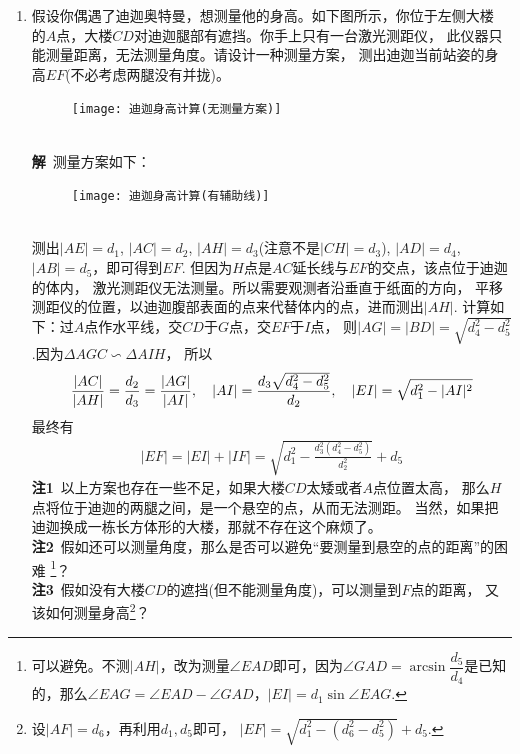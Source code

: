 \begin{enumerate}[label={【\textbf{例\thechapter.\arabic*}】},
 leftmargin=\inteval{\myenumleftmargin}pt,
 itemsep=\inteval{\myenumitempsep}pt,
 itemindent=\inteval{\myenumitemindent}pt]
\item 假设你偶遇了迪迦奥特曼，想测量他的身高。如下图所示，你位于左侧大楼
的$ A $点，大楼$ CD $对迪迦腿部有遮挡。你手上只有一台激光测距仪，
此仪器只能测量距离，无法测量角度。请设计一种测量方案，
测出迪迦当前站姿的身高$ EF $(不必考虑两腿没有并拢)。
\begin{figure}[h]
    \centering
    \texttt{[image: 迪迦身高计算(无测量方案)]}
\end{figure} \\
\textbf{解}\ 测量方案如下：
\begin{figure}[h]
    \centering
    \texttt{[image: 迪迦身高计算(有辅助线)]}
\end{figure} \\
测出$ |AE|=d_1 $, $ |AC|=d_2 $, $ |AH|=d_3 $(注意不是$ |CH|=d_3 $),
$ |AD|=d_4 $, $ |AB|=d_5 $，即可得到$ EF $.
但因为$ H $点是$ AC $延长线与$ EF $的交点，该点位于迪迦的体内，
激光测距仪无法测量。所以需要观测者沿垂直于纸面的方向，
平移测距仪的位置，以迪迦腹部表面的点来代替体内的点，进而测出$ |AH| $.
计算如下：过$ A $点作水平线，交$ CD $于$ G $点，交$ EF $于$ I $点，
则$ |AG|=|BD|=\sqrt{d_4^2-d_5^2} $.因为$ \Delta AGC \backsim \Delta AIH $，
所以
\begin{gather*}
    \dfrac{|AC|}{|AH|}=\dfrac{d_2}{d_3}=\dfrac{|AG|}{|AI|},\quad  |AI|=\dfrac{d_3\sqrt{d_4^2-d_5^2} }{d_2},\quad |EI|=\sqrt{d_1^2-|AI|^2}
\end{gather*}
最终有
\begin{gather*}
    |EF|=|EI|+|IF|=\sqrt{d_1^2-\frac{d_3^2(d_4^2-d_5^2)}{d_2^2}}+d_5
\end{gather*}
\textbf{注1}\ 以上方案也存在一些不足，如果大楼$ CD $太矮或者$ A $点位置太高，
那么$ H $点将位于迪迦的两腿之间，是一个悬空的点，从而无法测距。
当然，如果把迪迦换成一栋长方体形的大楼，那就不存在这个麻烦了。\\
\textbf{注2}\ 假如还可以测量角度，那么是否可以避免“要测量到悬空的点的距离”的困难
\footnote{可以避免。不测$ |AH| $，改为测量$ \angle EAD $即可，因为$ \angle 
    GAD=\arcsin\dfrac{d_5}{d_4} $是已知的，那么$ \angle EAG=\angle EAD-\angle 
    GAD $，$ |EI|=d_1\sin\angle EAG $. }？\\
\textbf{注3}\ 假如没有大楼$ CD $的遮挡(但不能测量角度)，可以测量到$ F $点的距离，
又该如何测量身高\footnote{设$ |AF|=d_6 $，再利用$ d_1,d_5 $即可，
    $ |EF|=\sqrt{d_1^2-(d_6^2-d_5^2)}+d_5 $. }？

\end{enumerate}

